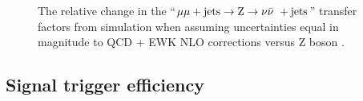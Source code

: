 \begin{figure}[!h]
{  } \\
   ~
   \\
  \caption{\label{fig:tfSyst_nlo_mumuToZinv} The relative change in the
    ``$\mu\mu + \textrm{jets} \rightarrow {\text Z} \rightarrow \nu\bar{\nu}\ + \textrm{jets}$'' transfer factors from
    simulation when assuming uncertainties equal in magnitude to QCD +
    EWK NLO corrections versus Z boson \Pt.  }
\end{figure}

\clearpage
\subsection{Signal trigger efficiency}

